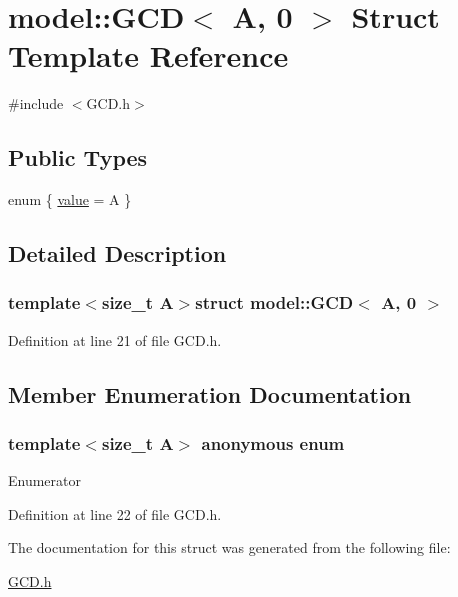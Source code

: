 \hypertarget{structmodel_1_1_g_c_d_3_01_a_00_010_01_4}{}\section{model\+:\+:G\+C\+D$<$ A, 0 $>$ Struct Template Reference}
\label{structmodel_1_1_g_c_d_3_01_a_00_010_01_4}


{\ttfamily \#include $<$G\+C\+D.\+h$>$}

\subsection*{Public Types}
\begin{DoxyCompactItemize}
\item 
enum \{ \hyperlink{structmodel_1_1_g_c_d_3_01_a_00_010_01_4_a115f3d5b7e8d534228674c7b1501cf22ac6560b55518d9f9c670df64d5117959c}{value} = A
 \}
\end{DoxyCompactItemize}


\subsection{Detailed Description}
\subsubsection*{template$<$size\+\_\+t A$>$struct model\+::\+G\+C\+D$<$ A, 0 $>$}



Definition at line 21 of file G\+C\+D.\+h.



\subsection{Member Enumeration Documentation}
\hypertarget{structmodel_1_1_g_c_d_3_01_a_00_010_01_4_a115f3d5b7e8d534228674c7b1501cf22}{}\subsubsection[{anonymous enum}]{\setlength{\rightskip}{0pt plus 5cm}template$<$size\+\_\+t A$>$ anonymous enum}\label{structmodel_1_1_g_c_d_3_01_a_00_010_01_4_a115f3d5b7e8d534228674c7b1501cf22}
\begin{Desc}
\item[Enumerator]\par
\begin{description}
\item[{\em 
\hypertarget{structmodel_1_1_g_c_d_3_01_a_00_010_01_4_a115f3d5b7e8d534228674c7b1501cf22ac6560b55518d9f9c670df64d5117959c}{}value\label{structmodel_1_1_g_c_d_3_01_a_00_010_01_4_a115f3d5b7e8d534228674c7b1501cf22ac6560b55518d9f9c670df64d5117959c}
}]\end{description}
\end{Desc}


Definition at line 22 of file G\+C\+D.\+h.



The documentation for this struct was generated from the following file\+:\begin{DoxyCompactItemize}
\item 
\hyperlink{_g_c_d_8h}{G\+C\+D.\+h}\end{DoxyCompactItemize}
